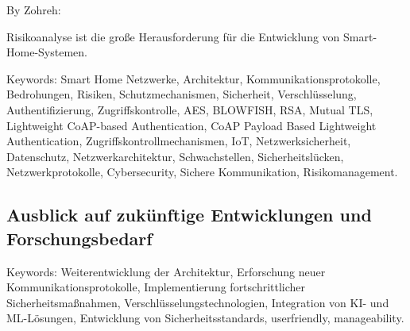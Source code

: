 By Zohreh:

Risikoanalyse ist die große Herausforderung für die Entwicklung von Smart-Home-Systemen.

Keywords: 
Smart Home Netzwerke, Architektur, Kommunikationsprotokolle, Bedrohungen, Risiken, Schutzmechanismen, Sicherheit, Verschlüsselung, Authentifizierung, Zugriffskontrolle, AES, BLOWFISH, RSA, Mutual TLS, Lightweight CoAP-based Authentication, CoAP Payload Based Lightweight Authentication, Zugriffskontrollmechanismen, IoT, Netzwerksicherheit, Datenschutz, Netzwerkarchitektur, Schwachstellen, Sicherheitslücken, Netzwerkprotokolle, Cybersecurity, Sichere Kommunikation, Risikomanagement.

\subsection{Ausblick auf zukünftige Entwicklungen und Forschungsbedarf}

Keywords:
Weiterentwicklung der Architektur, Erforschung neuer Kommunikationsprotokolle, Implementierung fortschrittlicher Sicherheitsmaßnahmen, Verschlüsselungstechnologien, Integration von KI- und ML-Lösungen, Entwicklung von Sicherheitsstandards, userfriendly, manageability.

\newpage

    \nocite{*}
    



